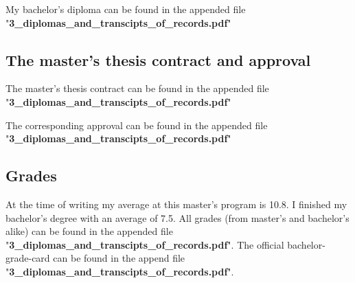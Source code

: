 \documentclass[a4paper]{article}
\begin{document}
My bachelor's diploma can be found in the appended file "\textbf{3\_diplomas\_and\_transcipts\_of\_records.pdf}"

\subsection{The master's thesis contract and approval}

The master's thesis contract can be found in the appended file "\textbf{3\_diplomas\_and\_transcipts\_of\_records.pdf}"\par

The corresponding approval can be found in the appended file "\textbf{3\_diplomas\_and\_transcipts\_of\_records.pdf}"

\subsection{Grades}

At the time of writing my average at this master's program is 10.8. I finished my bachelor's degree with an average of 7.5. All grades (from master's and bachelor's alike) can be found in the appended file "\textbf{3\_diplomas\_and\_transcipts\_of\_records.pdf}". The official bachelor-grade-card can be found in the append file "\textbf{3\_diplomas\_and\_transcipts\_of\_records.pdf}".\par
\end{document}
